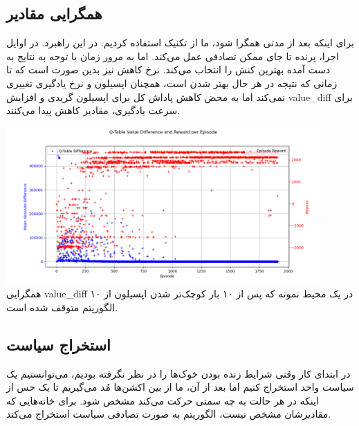 \documentclass[11pt, a4paper, oneside]{report}
\begin{document}
	 	\subsection{همگرایی مقادیر}
	برای اینکه بعد از مدتی همگرا شود، ما از تکنیک
\href{https://www.geeksforgeeks.org/epsilon-greedy-algorithm-in-reinforcement-learning/}{ }
استفاده کردیم. در این راهبرد. در اوایل اجرا، پرنده تا جای ممکن تصادفی عمل می‌کند. اما به مرور زمان با توجه به نتایج به دست آمده بهترین کنش را انتخاب می‌کند. نرخ کاهش نیز بدین صورت است که تا زمانی که نتیجه در هر حال بهتر شدن است، همچنان اپسیلون و نرخ یادگیری تغییری نمی‌کند اما به محض کاهش پاداش کل برای اپسیلون گریدی و افزایش value\_diff برای سرعت یادگیری، مقادیر کاهش پیدا می‌کنند.
\begin{center}
	\includegraphics[width=12cm]{./images/value_diff.png}
	{همگرایی value\_diff در یک محیط نمونه که پس از ۱۰ بار کوچک‌تر شدن اپسیلون از ۱۰ الگوریتم متوقف شده است.}
\end{center}
	
	\subsection{استخراج سیاست}
	در ابتدای کار وقتی شرایط زنده بودن خوک‌ها را در نظر نگرفته بودیم، می‌توانستیم یک سیاست واحد استخراج کنیم اما بعد از آن، ما از بین اکشن‌ها مُد می‌گیریم تا یک حس از اینکه در هر حالت به چه سمتی حرکت می‌کند مشخص شود. برای خانه‌هایی که مقادیرشان مشخص نیست، الگوریتم به صورت تصادفی سیاست استخراج می‌کند.
	
\end{document}
